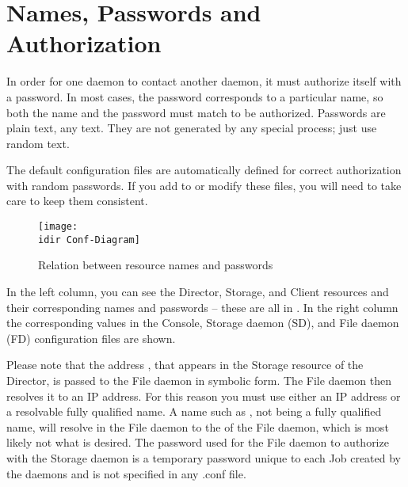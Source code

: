 \section{Names, Passwords and Authorization}
\label{Names}

In order for one daemon to contact another daemon, it must authorize itself
with a password. In most cases, the password corresponds to a particular name,
so both the name and the password must match to be authorized. Passwords are
plain text, any text.  They are not generated by any special process; just
use random text.

The default configuration files are automatically defined for correct
authorization with random passwords. If you add to or modify these files, you
will need to take care to keep them consistent.

\label{sec:resource-relation}
\begin{figure}[htbp]
\begin{center}
\texttt{[image: \\idir Conf-Diagram]}
\caption{Relation between resource names and passwords}
\end{center}
\end{figure}


In the left column, you can see the Director, Storage, and Client resources and their corresponding names and passwords -- these are all in . In
the right column the corresponding values in the
Console, Storage daemon (SD), and File daemon (FD) configuration files are shown.

Please note that the address , that appears in the Storage
resource of the Director,
is passed to the File daemon in symbolic form. The File daemon then resolves it
to an IP address. For this reason you must use either an IP address or a
resolvable fully qualified name. A name such as , not being a fully
qualified name, will resolve in the File daemon to the  of the File
daemon, which is most likely not what is desired. The password used for the
File daemon to authorize with the Storage daemon is a temporary password
unique to each Job created by the daemons and is not specified in any .conf
file.
